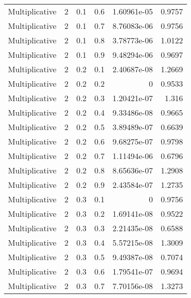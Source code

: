 \documentclass{article}
\begin{document}
\begin{longtable}[H]{lrrrrr}
 Multiplicative &       2 &   0.1 &            0.6 &      1.60961e-05 &          0.9757 \\
 Multiplicative &       2 &   0.1 &            0.7 &      8.76083e-06 &          0.9756 \\
 Multiplicative &       2 &   0.1 &            0.8 &      3.78773e-06 &          1.0122 \\
 Multiplicative &       2 &   0.1 &            0.9 &      9.48294e-06 &          0.9697 \\
 Multiplicative &       2 &   0.2 &            0.1 &      2.40687e-08 &          1.2669 \\
 Multiplicative &       2 &   0.2 &            0.2 &      0           &          0.9533 \\
 Multiplicative &       2 &   0.2 &            0.3 &      1.20421e-07 &          1.316  \\
 Multiplicative &       2 &   0.2 &            0.4 &      9.33486e-08 &          0.9665 \\
 Multiplicative &       2 &   0.2 &            0.5 &      3.89489e-07 &          0.6639 \\
 Multiplicative &       2 &   0.2 &            0.6 &      9.68275e-07 &          0.9798 \\
 Multiplicative &       2 &   0.2 &            0.7 &      1.11494e-06 &          0.6796 \\
 Multiplicative &       2 &   0.2 &            0.8 &      8.65636e-07 &          1.2908 \\
 Multiplicative &       2 &   0.2 &            0.9 &      2.43584e-07 &          1.2735 \\
 Multiplicative &       2 &   0.3 &            0.1 &      0           &          0.9756 \\
 Multiplicative &       2 &   0.3 &            0.2 &      1.69141e-08 &          0.9522 \\
 Multiplicative &       2 &   0.3 &            0.3 &      2.21435e-08 &          0.6588 \\
 Multiplicative &       2 &   0.3 &            0.4 &      5.57215e-08 &          1.3009 \\
 Multiplicative &       2 &   0.3 &            0.5 &      9.49387e-08 &          0.7074 \\
 Multiplicative &       2 &   0.3 &            0.6 &      1.79541e-07 &          0.9694 \\
 Multiplicative &       2 &   0.3 &            0.7 &      7.70156e-08 &          1.3273 \\

\end{longtable}
\end{document}
